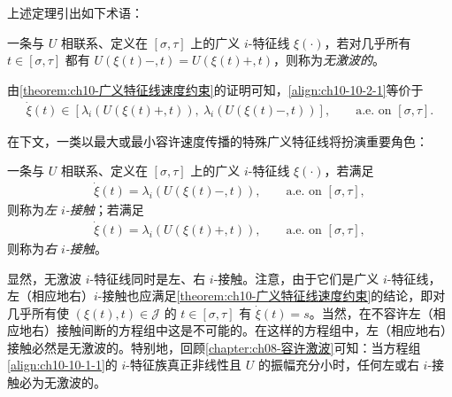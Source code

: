 \documentclass[../../main.tex]{subfiles}
\begin{document}
上述定理引出如下术语：

\begin{definition}\label{definition:ch10-无激波广义i特征线}
一条与 $U$ 相联系、定义在 $[\sigma,\tau]$ 上的广义 $i$-特征线 $\xi(\cdot)$，若对几乎所有 $t\in[\sigma,\tau]$ 都有 $U(\xi(t)-,t)=U(\xi(t)+,t)$，则称为\emph{无激波的}。
\end{definition}

由\cref{theorem:ch10-广义特征线速度约束}的证明可知，\eqref{align:ch10-10-2-1}等价于
\begin{align}
\dot{\xi}(t)\in\left[\lambda_{i}(U(\xi(t)+,t)),\ \lambda_{i}(U(\xi(t)-,t))\right],\qquad\text{a.e. on }[\sigma,\tau].
\label{align:ch10-10-2-4}
\end{align}

在下文，一类以最大或最小容许速度传播的特殊广义特征线将扮演重要角色：

\begin{definition}[左/右 $i$-接触]\label{definition:ch10-左右i接触}
一条与 $U$ 相联系、定义在 $[\sigma,\tau]$ 上的广义 $i$-特征线 $\xi(\cdot)$，若满足
\begin{align}
\dot{\xi}(t)=\lambda_{i}(U(\xi(t)-,t)),\qquad\text{a.e. on }[\sigma,\tau],
\label{align:ch10-10-2-5}
\end{align}
则称为\emph{左 $i$-接触}；若满足
\begin{align}
\dot{\xi}(t)=\lambda_{i}(U(\xi(t)+,t)),\qquad\text{a.e. on }[\sigma,\tau],
\label{align:ch10-10-2-6}
\end{align}
则称为\emph{右 $i$-接触}。
\end{definition}

显然，无激波 $i$-特征线同时是左、右 $i$-接触。注意，由于它们是广义 $i$-特征线，左（相应地右）$i$-接触也应满足\cref{theorem:ch10-广义特征线速度约束}的结论，即对几乎所有使 $(\xi(t),t)\in\mathscr{J}$ 的 $t\in[\sigma,\tau]$ 有 $\dot{\xi}(t)=s$。当然，在不容许左（相应地右）接触间断的方程组中这是不可能的。在这样的方程组中，左（相应地右）接触必然是无激波的。特别地，回顾\cref{chapter:ch08-容许激波}可知：当方程组\eqref{align:ch10-10-1-1}的 $i$-特征族真正非线性且 $U$ 的振幅充分小时，任何左或右 $i$-接触必为无激波的。
\end{document}
